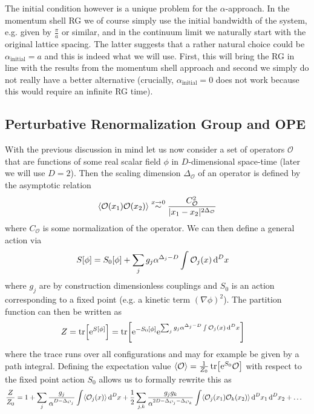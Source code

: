 \documentclass[english, parskip=full]{scrartcl}
\begin{document}
The initial condition however is a unique problem for the $\alpha$-approach.
In the momentum shell RG we of course simply use the initial bandwidth of the system, e.g. given by $\frac{\pi}{a}$ or similar, and in the continuum limit we naturally start with the original lattice spacing.
The latter suggests that a rather natural choice could be $\alpha_\text{initial} = a$ and this is indeed what we will use.
First, this will bring the RG in line with the results from the momentum shell approach and second we simply do not really have a better alternative (crucially, $\alpha_\text{initial} = 0$ does not work because this would require an infinite RG time).
\subsection{Perturbative Renormalization Group and OPE}
With the previous discussion in mind let us now consider a set of operators $\mathcal{O}$ that are functions of some real scalar field $\phi$ in $D$-dimensional space-time (later we will use $D=2$).
Then the scaling dimension $\Delta_{\mathcal{O}}$ of an operator is defined by the asymptotic relation
\begin{align}
\bra*{\mathcal{O}(x_1) \mathcal{O}(x_2)} \overset{x\rightarrow 0}{\sim} \frac{C_{\mathcal{O}}^2}{|x_1-x_2|^{2\Delta_{\mathcal{O}}}}
\end{align}
where $C_\mathcal{O}$ is some normalization of the operator.
We can then define a general action via
\begin{align}
S[\phi] &= S_0[\phi] + \sum_j g_j \alpha^{\Delta_{j} - D} \int \mathcal{O}_j(x)\,\d^Dx
\end{align}
where $g_j$ are by construction dimensionless couplings and $S_0$ is an action corresponding to a fixed point (e.g. a kinetic term $(\nabla\phi)^2$).
The partition function can then be written as
\begin{align}
Z &= \tr \klb*{\powe{S[\phi]}} = \tr \klb*{\powe{-S_0[\phi]} \powe{\sum_j g_j \alpha^{\Delta_{j} - D} \int \mathcal{O}_j(x)\,\d^Dx}}
\end{align}
where the trace runs over all configurations and may for example be given by a path integral.
Defining the expectation value $\bra*{\mathcal{O}} = \frac{1}{Z_0} \tr \klb*{ \powe{S_0} \mathcal{O}}$ with respect to the fixed point action $S_0$ allows us to formally rewrite this as
\begin{align}
\frac{Z}{Z_0} &=1 + \sum_j \frac{g_j}{\alpha^{D-\Delta_{\mathcal{O}_j}}} \int \bra*{\mathcal{O}_j(x)}\,\d^Dx + \frac{1}{2} \sum_{j,k} \frac{g_j g_k}{\alpha^{2D-\Delta_{\mathcal{O}_j}-\Delta_{\mathcal{O}_k}}} \int \bra*{\mathcal{O}_j(x_1) \mathcal{O}_k(x_2)}\,\d^Dx_1\,\d^Dx_2 + \dots 
\end{align}
\end{document}
